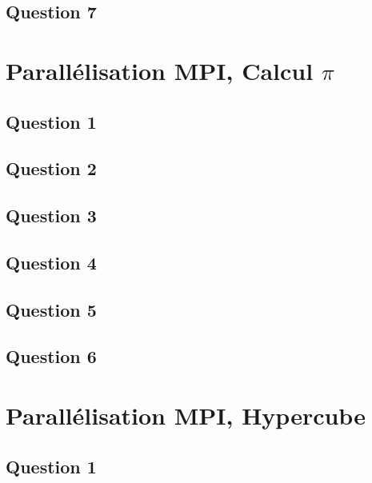 \documentclass{article}
\begin{document}
\newpage\subsection*{Question 7}
\begin{resolution}
    
\end{resolution}


\section{Parallélisation MPI, Calcul $\pi$}
\newpage\subsection*{Question 1}

\newpage\subsection*{Question 2}

\newpage\subsection*{Question 3}

\newpage\subsection*{Question 4}

\newpage\subsection*{Question 5}

\newpage\subsection*{Question 6}



\section{Parallélisation MPI, Hypercube}
\subsection*{Question 1}
\begin{resolution}
    
\end{resolution}
\end{document}

